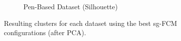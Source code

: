 \begin{figure}[H]
\begin{subfigure}{0.32\textwidth}
		\caption{Pen-Based Dataset (Silhouette)}
	\end{subfigure}
	\caption{Resulting clusters for each dataset using the best sg-FCM configurations (after PCA).}
	\label{fig:sgfcm:clusters}
\end{figure}